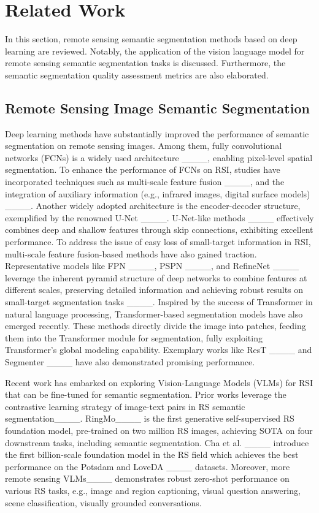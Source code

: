 \section{Related Work}
\label{sec:related_work}
  
  In this section, remote sensing semantic segmentation methods based on deep learning are reviewed. Notably, the application of the vision language model for remote sensing semantic segmentation tasks is discussed. Furthermore, the semantic segmentation quality assessment metrics are also elaborated.

\subsection{Remote Sensing Image Semantic Segmentation}\label{section RSss}
Deep learning methods have substantially improved the performance of semantic segmentation on remote sensing images. Among them, fully convolutional networks (FCNs) is a widely used architecture ____, enabling pixel-level spatial segmentation. To enhance the performance of FCNs on RSI, studies have incorporated techniques such as multi-scale feature fusion ____, and the integration of auxiliary information (e.g., infrared images, digital surface models) ____. Another widely adopted architecture is the encoder-decoder structure, exemplified by the renowned U-Net ____. U-Net-like methods ____ effectively combines deep and shallow features through skip connections, exhibiting excellent performance. To address the issue of easy loss of small-target information in RSI, multi-scale feature fusion-based methods have also gained traction. Representative models like FPN ____, PSPN ____, and RefineNet ____ leverage the inherent pyramid structure of deep networks to combine features at different scales, preserving detailed information and achieving robust results on small-target segmentation tasks ____.
Inspired by the success of Transformer in natural language processing, Transformer-based segmentation models have also emerged recently. These methods directly divide the image into patches, feeding them into the Transformer module for segmentation, fully exploiting Transformer's global modeling capability. Exemplary works like ResT ____ and Segmenter ____ have also demonstrated promising performance.

Recent work has embarked on exploring Vision-Language Models (VLMs) for RSI that can be fine-tuned for semantic segmentation. Prior works leverage the contrastive learning strategy of image-text pairs in RS semantic segmentation____. RingMo____ is the first generative self-supervised RS foundation model, pre-trained on two million RS images, achieving SOTA on four downstream tasks, including semantic segmentation. Cha et al. ____ introduce the first billion-scale foundation model in the RS field which achieves the best performance on the Potsdam and LoveDA ____ datasets. Moreover, more remote sensing  VLMs____ demonstrates robust zero-shot performance on various RS tasks, e.g., image and region captioning, visual question answering, scene classification, visually grounded conversations.
